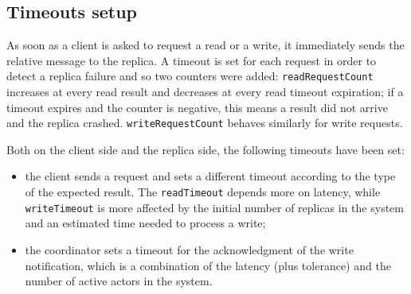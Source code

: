 \subsection{Timeouts setup}

As soon as a client is asked to request a read or a write, it immediately sends the relative message to the replica. A timeout is set for each request in order to detect a replica failure and so two counters were added: \texttt{readRequestCount} increases at every read result and decreases at every read timeout expiration; if a timeout expires and the counter is negative, this means a result did not arrive and the replica crashed. \texttt{writeRequestCount} behaves similarly for write requests.

Both on the client side and the replica side, the following timeouts have been set:

\begin{itemize}
\item the client sends a request and sets a different timeout according to the type of the expected result. The \texttt{readTimeout} depends more on latency, while \texttt{writeTimeout} is more affected by the initial number of replicas in the system and an estimated time needed to process a write;

\item the coordinator sets a timeout for the acknowledgment of the write notification, which is a combination of the latency (plus tolerance) and the number of active actors in the system.
\end{itemize}
